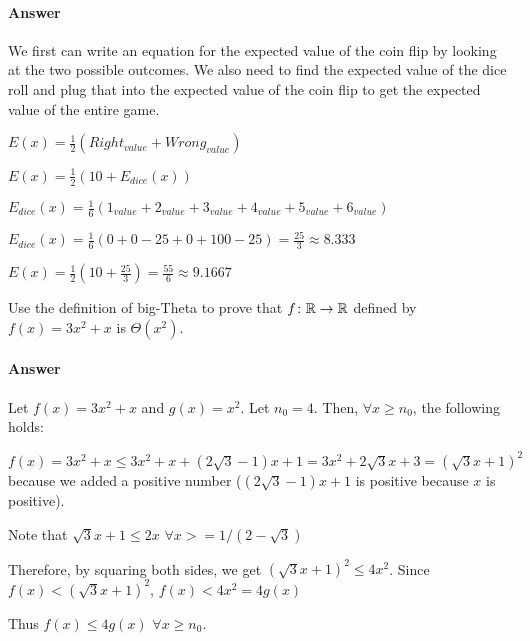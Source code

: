 \documentclass{article}
\begin{document}
\begin{enumerate}
        \paragraph{Answer} We first can write an equation for the expected value of the coin flip by looking at the two possible outcomes. We also need to find the expected value of the dice roll and plug that into the expected value of the coin flip to get the expected value of the entire game.
        
        $E(x) = \frac{1}{2}(Right_{value} + Wrong_{value})$
        
        $E(x) = \frac{1}{2}(10 + E_{dice}(x))$
        
        $E_{dice}(x) = \frac{1}{6}(1_{value} + 2_{value} + 3_{value} + 4_{value} + 5_{value} + 6_{value})$
        
        $E_{dice}(x) = \frac{1}{6}(0 + 0 - 25 + 0 + 100 - 25) = \frac{25}{3} \approx 8.333$
        
        $E(x) = \frac{1}{2}(10 + \frac{25}{3}) = \frac{55}{6} \approx 9.1667$
        
\end{enumerate}

 

Use the definition of big-Theta to prove that $f \colon {\mathbb R} \to {\mathbb R}$ defined by
$f(x) = 3x^2+x$ is $\Theta(x^2)$.

\paragraph{Answer}

Let $f(x) = 3x^2+x$ and $g(x) = x^2$. Let $n_0 = 4$. Then, $\forall x \geq n_0$, the following holds:

$f(x) = 3x^2+x \leq 3x^2 + x + (2\sqrt{3}-1)x + 1 = 3x^2 + 2\sqrt{3}x + 3 = (\sqrt{3}x+1)^2$ because we added a positive number ($(2\sqrt{3}-1)x + 1$ is positive because $x$ is positive).

Note that $\sqrt{3}x + 1 \leq 2x$  $\forall x >= 1/(2-\sqrt{3})$

Therefore, by squaring both sides, we get $(\sqrt{3}x+1)^2 \leq 4x^2$.
Since $f(x) < (\sqrt{3}x+1)^2$, $f(x) < 4x^2 = 4g(x)$

Thus $f(x) \leq 4g(x)$ $\forall x \geq n_0$.
\end{document}

